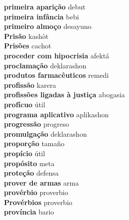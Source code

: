 \textbf{ primeira aparição  } debut \\
\textbf{ primeira infância  } bebi \\
\textbf{ primeiro almoço  } desayuno \\
\textbf{ Prisão  } kashòt \\
\textbf{ Prisões  } cachot \\
\textbf{ proceder com hipocrisia  } afektá \\
\textbf{ proclamação  } deklarashon \\
\textbf{ produtos farmacêuticos  } remedi \\
\textbf{ profissão  } karera \\
\textbf{ profissões ligadas à justiça  } abogasia \\
\textbf{ profícuo  } útil \\
\textbf{ programa aplicativo  } aplikashon \\
\textbf{ progressão  } progreso \\
\textbf{ promulgação  } deklarashon \\
\textbf{ proporção  } tamaño \\
\textbf{ propício  } útil \\
\textbf{ propósito  } meta \\
\textbf{ proteção  } defensa \\
\textbf{ prover de armas  } arma \\
\textbf{ provérbio  } proverbio \\
\textbf{ Provérbios  } proverbio \\
\textbf{ província  } bario \\
